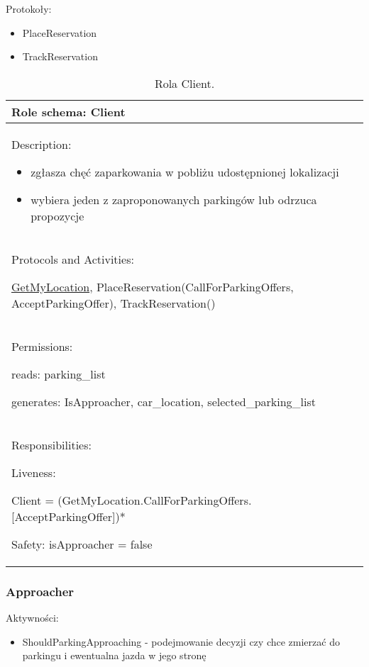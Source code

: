 Protokoły:
\begin{itemize}
    \item PlaceReservation
    \item TrackReservation
\end{itemize}


\begin{table}[!h] \label{tab:rola1} \centering
    \caption{Rola Client.}
    \begin{tabular} {| p{14cm} |} \hline
        Role schema: Client \\ \hline
        Description:

        \begin{itemize}
            \item zgłasza chęć zaparkowania w pobliżu udostępnionej lokalizacji
            \item wybiera jeden z zaproponowanych parkingów lub odrzuca propozycje
            
        \end{itemize} \\ \hline
        Protocols and Activities: 
        
        \ul{GetMyLocation}, PlaceReservation(CallForParkingOffers, AcceptParkingOffer), TrackReservation() \\ \hline
        Permissions:

        reads: parking\_list

        generates:  IsApproacher, car\_location, selected\_parking\_list \\ \hline
        Responsibilities:

        Liveness: 
        
        Client = (GetMyLocation.CallForParkingOffers.[AcceptParkingOffer])*


        Safety: isApproacher = false \\ \hline
    \end{tabular}
\end{table}

\newpage
\subsubsection{Approacher}

Aktywności: 
\begin{itemize}
    \item ShouldParkingApproaching - podejmowanie decyzji czy chce zmierzać do parkingu i ewentualna jazda w jego stronę
\end{itemize}


